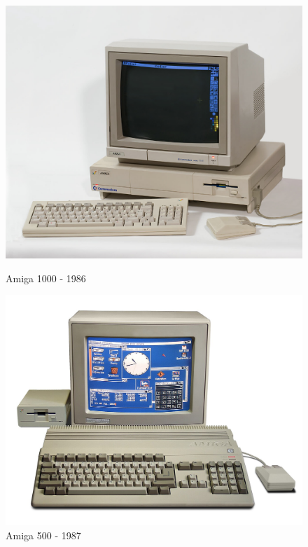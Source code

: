 \begin{figure}[h]
  \begin{minipage}[b]{0.30\linewidth}
    \centering
    \includegraphics[width=\linewidth]{images/demoscene/amiga1000.png}
    \caption{Amiga 1000 - 1986}
    \label{am1000}
  \end{minipage}
  \hfill
  \begin{minipage}[b]{0.30\linewidth}
    \centering
    \includegraphics[width=\linewidth]{images/demoscene/amiga500.png}
    \caption{Amiga 500 - 1987}
    \label{am500}
  \end{minipage}

\end{figure}
